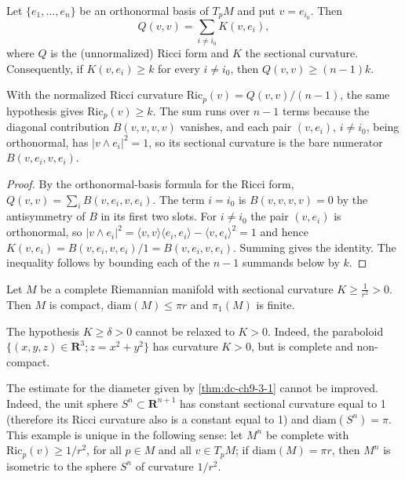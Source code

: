 \begin{lemma}
  \label{lem:dc-ch9-3-3-ricci-sectional}
  \leanok
  Let $\{e_1,\dots,e_n\}$ be an orthonormal basis of $T_pM$ and put $v=e_{i_0}$. Then
  $$
  Q(v,v)=\sum_{i\ne i_0}K(v,e_i),
  $$
  where $Q$ is the (unnormalized) Ricci form and $K$ the sectional curvature.
  Consequently, if $K(v,e_i)\ge k$ for every $i\ne i_0$, then $Q(v,v)\ge(n-1)k$.

  With the normalized Ricci curvature
  $\mathrm{Ric}_p(v)=Q(v,v)/(n-1)$, the same hypothesis gives
  $\mathrm{Ric}_p(v)\ge k$. The sum runs over $n-1$ terms because the diagonal contribution $B(v,v,v,v)$
  vanishes, and each pair $(v,e_i)$, $i\ne i_0$, being orthonormal, has $|v\wedge e_i|^2=1$,
  so its sectional curvature is the bare numerator $B(v,e_i,v,e_i)$.
\end{lemma}
\begin{proof}
  \leanok
  \sketch
  By the orthonormal-basis formula for the Ricci form, $Q(v,v)=\sum_i B(v,e_i,v,e_i)$. The
  term $i=i_0$ is $B(v,v,v,v)=0$ by the antisymmetry of $B$ in its first two slots. For
  $i\ne i_0$ the pair $(v,e_i)$ is orthonormal, so
  $|v\wedge e_i|^2=\langle v,v\rangle\langle e_i,e_i\rangle-\langle v,e_i\rangle^2=1$ and
  hence $K(v,e_i)=B(v,e_i,v,e_i)/1=B(v,e_i,v,e_i)$. Summing gives the identity. The
  inequality follows by bounding each of the $n-1$ summands below by $k$.
\end{proof}
\begin{corollary}
  \label{cor:dc-ch9-3-3}
  Let $M$ be a complete Riemannian manifold with sectional curvature
  $K\ge\frac{1}{r^2}>0$. Then $M$ is compact, $\mathrm{diam}(M)\le\pi r$ and
  $\pi_1(M)$ is finite.
\end{corollary}
\begin{remark}
  \label{rem:dc-ch9-3-4}
  The hypothesis $K\ge\delta>0$ cannot be relaxed to $K>0$. Indeed, the paraboloid
  $\{(x,y,z)\in\mathbf{R}^3;z=x^2+y^2\}$ has curvature $K>0$, but is complete and
  non-compact.
\end{remark}
\begin{remark}
  \label{rem:dc-ch9-3-6}
  The estimate for the diameter given by \cref{thm:dc-ch9-3-1} cannot be improved. Indeed, the
  unit sphere $S^n\subset\mathbf{R}^{n+1}$ has constant sectional curvature equal to
  1 (therefore its Ricci curvature also is a constant equal to 1) and
  $\mathrm{diam}(S^n)=\pi$. This example is unique in the following sense: let $M^n$
  be complete with $\mathrm{Ric}_p(v)\ge 1/r^2$, for all $p\in M$ and all $v\in T_pM$;
  if $\mathrm{diam}(M)=\pi r$, then $M^n$ is isometric to the sphere $S^n$ of
  curvature $1/r^2$.
\end{remark}
